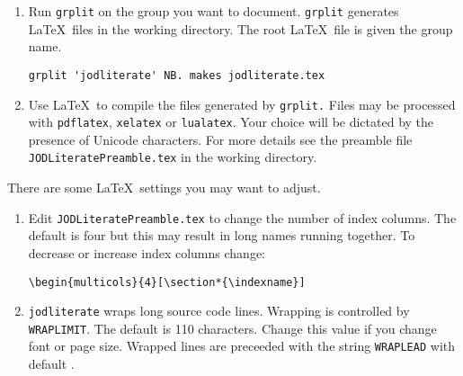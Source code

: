 \begin{enumerate}[1.]
\begin{verbatim}
setjodliterate 'c:\temp'          NB. windows
setjodliterate '/home/john/temp'  NB. linux
\end{verbatim}
\item
  Run \texttt{grplit} on the group you want to document. \texttt{grplit}
  generates \LaTeX~files in the working directory. The root \LaTeX~file
  is given the group name.

\begin{verbatim}
grplit 'jodliterate' NB. makes jodliterate.tex 
\end{verbatim}
\item
  Use \LaTeX~to compile the files generated by \texttt{grplit.} Files
  may be processed with \texttt{pdflatex}, \texttt{xelatex} or
  \texttt{lualatex}. Your choice will be dictated by the presence of
  Unicode characters. For more details see the preamble file
  \texttt{JODLiteratePreamble.tex} in the working directory.
\end{enumerate}

There are some \LaTeX~settings you may want to adjust.

\begin{enumerate}[1.]
\item
  Edit \texttt{JODLiteratePreamble.tex} to change the number of index
  columns. The default is four but this may result in long names running
  together. To decrease or increase index columns change:

\begin{verbatim}
\begin{multicols}{4}[\section*{\indexname}]
\end{verbatim}
\item
  \texttt{jodliterate} wraps long source code lines. Wrapping is
  controlled by \texttt{WRAPLIMIT}. The default is 110 characters.
  Change this value if you change font or page size. Wrapped lines are
  preceeded with the string \texttt{WRAPLEAD} with default
  .
\end{enumerate}
